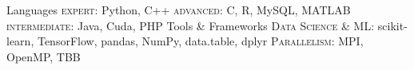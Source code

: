 \begin{cvskills}
  \cvskill
    {Languages} %
    {\textsc{expert}: Python, C++ \quad \textsc{advanced}: C, R, MySQL, MATLAB \quad \textsc{intermediate}: Java, Cuda, PHP} %
  \cvskill
    {Tools \& Frameworks} %
    {\textsc{Data Science \& ML}: scikit-learn, TensorFlow, pandas, NumPy, data.table, dplyr \quad \textsc{Parallelism}: MPI, OpenMP, TBB} %
\end{cvskills}
